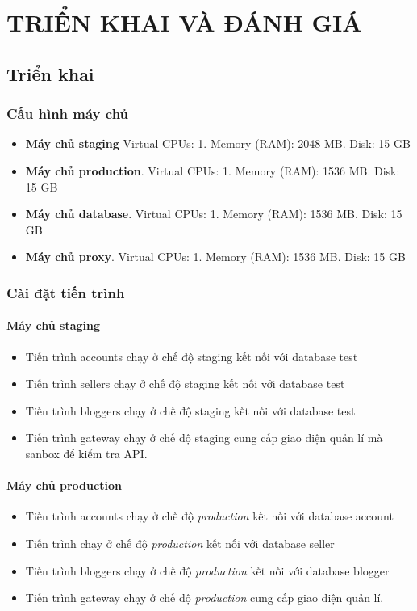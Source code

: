 
\chapter{TRIỂN KHAI VÀ ĐÁNH GIÁ}\label{section:dev}

\section{Triển khai}

\subsection{Cấu hình máy chủ}

\begin{itemize}
	\item \textbf{Máy chủ staging} Virtual CPUs: 1. Memory (RAM): 2048 MB. Disk: 15 GB
	
	\item \textbf{Máy chủ production}. Virtual CPUs: 1. Memory (RAM): 1536 MB. Disk: 15 GB
	
	\item \textbf{Máy chủ database}. Virtual CPUs: 1. Memory (RAM): 1536 MB. Disk: 15 GB
	
	\item \textbf{Máy chủ proxy}. Virtual CPUs: 1. Memory (RAM): 1536 MB. Disk: 15 GB
\end{itemize}
\subsection{Cài đặt tiến trình}


\subsubsection{Máy chủ staging}
\begin{itemize}
	\item Tiến trình accounts chạy ở chế độ staging kết nối với database test
	\item Tiến trình sellers chạy ở chế độ staging kết nối với database test
	\item Tiến trình bloggers chạy ở chế độ staging kết nối với database test
	\item Tiến trình gateway chạy ở chế độ staging cung cấp giao diện quản lí mà sanbox để kiểm tra API.
\end{itemize}
\subsubsection{Máy chủ production}
\begin{itemize}
	\item Tiến trình accounts chạy ở chế độ \emph{production} kết nối với database account
	\item Tiến trình  chạy ở chế độ \emph{production} kết nối với database seller
	\item Tiến trình bloggers chạy ở chế độ \emph{production} kết nối với database blogger
	\item Tiến trình gateway chạy ở chế độ \emph{production} cung cấp giao diện quản lí.
\end{itemize}

